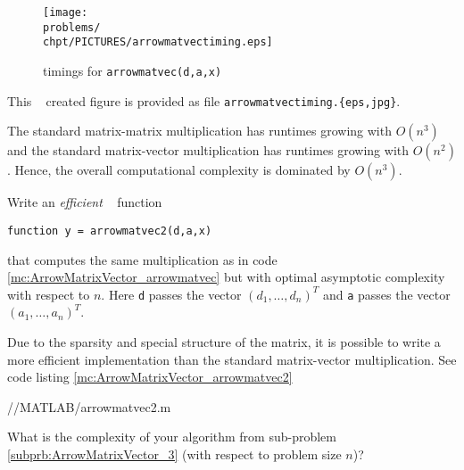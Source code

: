 \begin{problem}
\begin{subproblem}[2]
\begin{figure}[ht]
\centering
\texttt{[image: \\problems/\\chpt/PICTURES/arrowmatvectiming.eps]}
\caption{timings for \texttt{arrowmatvec(d,a,x)}}
\label{fig:arrowmatvectiming}
\end{figure}


\begin{hint}
This \Matlab~ created figure is provided as file
\texttt{arrowmatvectiming.\{eps,jpg\}}.
\end{hint}

\begin{solution}
The standard matrix-matrix multiplication has runtimes growing with $O(n^3)$ and the standard matrix-vector multiplication has runtimes growing with $O(n^2)$. Hence, the overall computational complexity is dominated by $O(n^3)$.
\end{solution}
\end{subproblem}


\begin{subproblem}[3]  \label{subprb:ArrowMatrixVector_3}
Write an \emph{efficient} \Matlab~ function 
\begin{center}
  \texttt{function y = arrowmatvec2(d,a,x)}
\end{center}
that computes the same multiplication as in code \ref{mc:ArrowMatrixVector_arrowmatvec} but with optimal asymptotic complexity with respect to {$n$}.
Here \texttt{d} passes the vector $(d_{1},\ldots,d_{n})^{T}$ and \texttt{a} passes the vector $(a_{1},\ldots,a_{n})^{T}$.

\begin{solution}
 Due to the sparsity and special structure of the matrix, it is possible to write a more efficient implementation than the standard matrix-vector multiplication. See code listing \ref{mc:ArrowMatrixVector_arrowmatvec2}
\vspace{0.5cm}


{\problems/\chpt/MATLAB/arrowmatvec2.m}
\end{solution}
\end{subproblem}


\begin{subproblem}[1]  \label{subprb:ArrowMatrixVector_4}
What is the complexity of your algorithm from sub-problem
\ref{subprb:ArrowMatrixVector_3} (with respect to problem size $n$)? 


\end{subproblem}
\end{problem}
